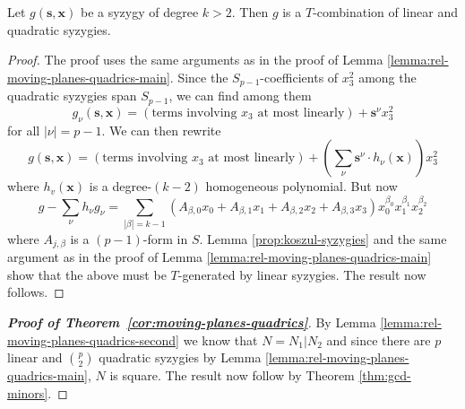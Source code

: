 \documentclass[fleqn,reqno]{amsart}
\begin{document}
\begin{lemma}
\label{lemma:rel-moving-planes-quadrics-second}
Let $g(\mathbf s, \mathbf x)$ be a syzygy of degree $k>2$.
Then $g$ is a $T$-combination of linear and quadratic syzygies.
\end{lemma}

\begin{proof}
The proof uses the same arguments as in the proof of Lemma \ref{lemma:rel-moving-planes-quadrics-main}.
Since the $S_{p-1}$-coefficients of $x_3^2$ among the quadratic syzygies span $S_{p-1}$,
we can find among them
\[
	g_\nu(\mathbf s,\mathbf x)=(\text{terms involving $x_3$ at most linearly})+{\mathbf s}^\nu x_3^2
\]
for all $|\nu|=p-1$. We can then rewrite
\[
	g(\mathbf s,\mathbf x)=(\text{terms involving $x_3$ at most linearly})+(\sum_\nu {\mathbf s}^\nu\cdot h_\nu(\mathbf x))x_3^2
\]
where $h_v(\mathbf x)$ is a degree-$(k-2)$ homogeneous polynomial. But now
\[
	g-\sum_\nu h_\nu g_\nu=\sum_{|\beta|=k-1} (A_{\beta,0}x_0+A_{\beta,1}x_1+A_{\beta,2}x_2+A_{\beta,3}x_3) x_0^{\beta_0}x_1^{\beta_1}x_2^{\beta_2}
\]
where $A_{j,\beta}$ is a $(p-1)$-form in $S$.
Lemma \ref{prop:koszul-syzygies} and the same argument as in the proof of Lemma \ref{lemma:rel-moving-planes-quadrics-main}
show that the above must be $T$-generated by linear syzygies.
The result now follows.
\end{proof}

\begin{proof}[\bf Proof of Theorem~\ref{cor:moving-planes-quadrics}]
By Lemma \ref{lemma:rel-moving-planes-quadrics-second} we know that $N=N_1|N_2$
and since there are $p$ linear and $\binom{p}{2}$ quadratic syzygies
by Lemma \ref{lemma:rel-moving-planes-quadrics-main}, $N$ is square.
The result now follow by Theorem \ref{thm:gcd-minors}.
\end{proof}




\end{document}
